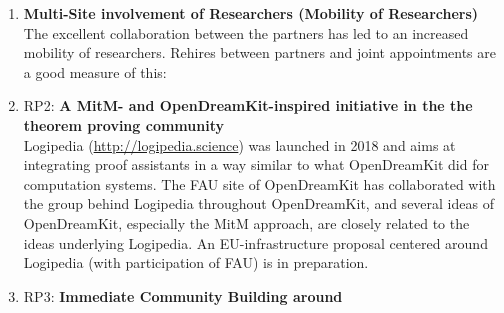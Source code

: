 \begin{enumerate}
\item \textbf{Multi-Site involvement of Researchers (Mobility of Researchers)}\\
  The excellent collaboration between the \ODK partners has led to an
  increased mobility of researchers. Rehires between partners and
  joint appointments are a good measure of this:
\item RP2: \textbf{A MitM- and OpenDreamKit-inspired initiative in the the theorem proving community}\\
  Logipedia (\url {http://logipedia.science}) was launched in 2018 and aims at integrating proof assistants in a way similar to what OpenDreamKit did for computation systems.
  The FAU site of OpenDreamKit has collaborated with the group behind Logipedia throughout OpenDreamKit, and several ideas of OpenDreamKit, especially the MitM approach, are closely related to the ideas underlying Logipedia.
  An EU-infrastructure proposal centered around Logipedia (with participation of FAU) is in preparation.
\item RP3: \textbf{Immediate Community Building around \dmh}
\end{enumerate}


